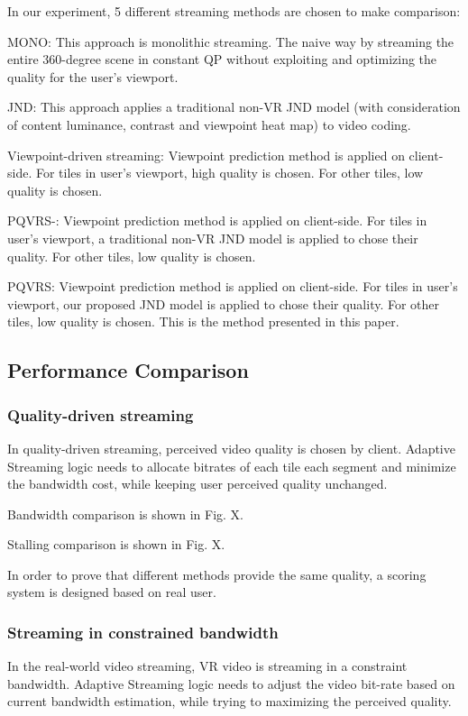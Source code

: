 In our experiment, 5 different streaming methods are chosen to make comparison:

MONO: This approach is monolithic streaming. The naive way by streaming the entire 360-degree scene in constant QP without exploiting and optimizing the quality for the user’s viewport.

JND: This approach applies a traditional non-VR JND model (with consideration of content luminance, contrast and viewpoint heat map) to video coding. 

Viewpoint-driven streaming: Viewpoint prediction method is applied on client-side. For tiles in user's viewport, high quality is chosen. For other tiles, low quality is chosen.

PQVRS-: Viewpoint prediction method is applied on client-side. For tiles in user's viewport, a traditional non-VR JND model is applied to chose their quality. For other tiles, low quality is chosen.

PQVRS: Viewpoint prediction method is applied on client-side. For tiles in user's viewport, our proposed JND model is applied to chose their quality. For other tiles, low quality is chosen. This is the method presented in this paper.

\subsection{Performance Comparison}

\subsubsection{Quality-driven streaming}

In quality-driven streaming, perceived video quality is chosen by client. Adaptive Streaming logic needs to allocate bitrates of each tile each segment and minimize the bandwidth cost, while keeping user perceived quality unchanged.

Bandwidth comparison is shown in Fig. X.

Stalling comparison is shown in Fig. X.

In order to prove that different methods provide the same quality, a scoring system is designed based on real user.

\subsubsection{Streaming in constrained bandwidth}

In the real-world video streaming, VR video is streaming in a constraint bandwidth. Adaptive Streaming logic needs to adjust the video bit-rate based on current bandwidth estimation, while trying to maximizing the perceived quality.

